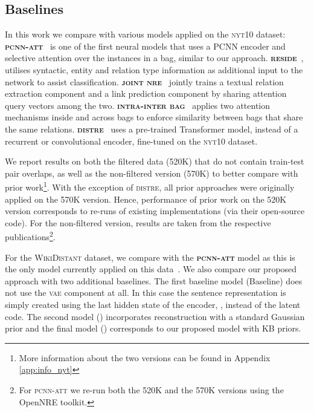 \documentclass[11pt]{article}
\begin{document}
\subsection{Baselines}
In this work we compare with various models applied on the \textsc{nyt10} dataset:
\textsc{\textbf{pcnn-att}}~\citep{lin2016neural} is one of the first neural models that uses a PCNN encoder and selective attention over the instances in a bag, similar to our approach. 
\textsc{\textbf{reside}}~\citep{vashishth2018reside}, utilises syntactic, entity and relation type information as additional input to the network to assist classification. 
\textsc{\textbf{joint nre}}~\citep{han2018jointnre} jointly trains a textual relation extraction component and a link prediction component by sharing attention query vectors among the two. 
\textsc{\textbf{intra-inter bag}}~\citep{ye2019intra-inter} applies two attention mechanisms inside and across bags to enforce similarity between bags that share the same relations. 
\textbf{\textsc{distre}}~\citep{alt2019fine} uses a pre-trained Transformer model, instead of a recurrent or convolutional encoder, fine-tuned on the \textsc{nyt10} dataset. 

We report results on both the filtered data (520K) that do not contain train-test pair overlaps, as well as the non-filtered version (570K) to better compare with prior work\footnote{More information about the two versions can be found in Appendix \ref{app:info_nyt}}.
With the exception of \textsc{distre}, all prior approaches were originally applied on the 570K version. 
Hence, performance of prior work on the 520K version corresponds to re-runs of existing implementations (via their open-source code). For the non-filtered version, results are taken from the respective publications\footnote{For \textsc{pcnn-att} we re-run both the 520K and the 570K versions using the OpenNRE toolkit.}. 

For the \textsc{WikiDistant} dataset, we compare with the \textsc{\textbf{pcnn-att}} model as this is the only model currently applied on this data~\citep{han2020more}.
We also compare our proposed approach with two additional baselines. The first baseline model (Baseline) does not use the \textsc{vae} component at all. 
In this case the sentence representation is simply created using the last hidden state of the encoder, , instead of the latent code.
The second model () incorporates reconstruction with a standard Gaussian prior and the final model () corresponds to our proposed model with KB priors. 
\end{document}
